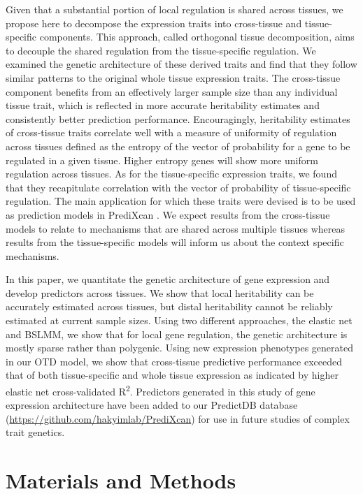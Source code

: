 \documentclass[10pt,letterpaper]{article}
\begin{document}
Given that a substantial portion of local regulation is shared across tissues, we propose here to decompose the expression traits into cross-tissue and tissue-specific components. This approach, called orthogonal tissue decomposition, aims to decouple the shared regulation from the tissue-specific regulation. We examined the genetic architecture of these derived traits and find that they follow similar patterns to the original whole tissue expression traits. The cross-tissue component benefits from an effectively larger sample size than any individual tissue trait, which is reflected in more accurate heritability estimates and consistently better prediction performance. Encouragingly, heritability estimates of cross-tissue traits correlate well with a measure of uniformity of regulation across tissues defined as the entropy of the vector of probability for a gene to be regulated in a given tissue. Higher entropy genes will show more uniform regulation across tissues. As for the tissue-specific expression traits, we found that they recapitulate correlation with the vector of probability of tissue-specific regulation. The main application for which these traits were devised is to be used as prediction models in PrediXcan \cite{Gamazon_2015}. We expect results from the cross-tissue models to relate to mechanisms that are shared across multiple tissues whereas results from the tissue-specific models will inform us about the context specific mechanisms. 

In this paper, we quantitate the genetic architecture of gene expression and develop predictors across tissues. We show that local heritability can be accurately estimated across tissues, but distal heritability cannot be reliably estimated at current sample sizes. Using two different approaches, the elastic net and BSLMM, we show that for local gene regulation, the genetic architecture is mostly sparse rather than polygenic. Using new expression phenotypes generated in our OTD model, we show that cross-tissue predictive performance exceeded that of both tissue-specific and whole tissue expression as indicated by higher elastic net cross-validated R\textsuperscript{2}. Predictors generated in this study of gene expression architecture have been added to our PredictDB database (\url{https://github.com/hakyimlab/PrediXcan}) for use in future studies of complex trait genetics.


\section*{Materials and Methods}
\end{document}
